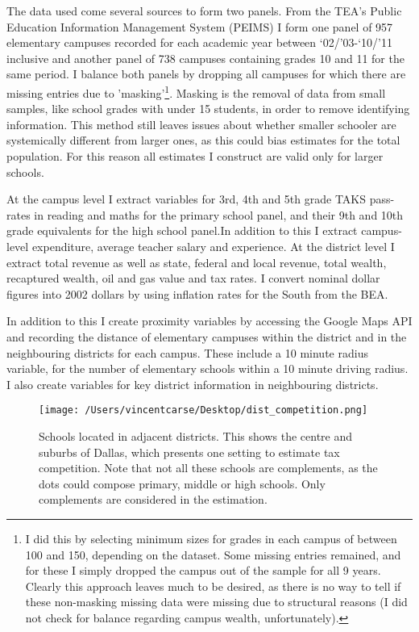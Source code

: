 \documentclass[11pt]{article}
\begin{document}
The data used come several sources to form two panels. From the TEA’s Public Education Information Management System (PEIMS) I form one panel of 957 elementary campuses recorded for each academic year between ‘02/’03-‘10/’11 inclusive and another panel of 738 campuses containing grades 10 and 11 for the same period.  I balance both panels by dropping all campuses for which there are missing entries due to 'masking'\footnote{I did this by selecting minimum sizes for grades in each campus of between 100 and 150, depending on the dataset. Some missing entries remained, and for these I simply dropped the campus out of the sample for all 9 years. Clearly this approach leaves much to be desired, as there is no way to tell if these non-masking missing data were missing due to structural reasons (I did not check for balance regarding campus wealth, unfortunately).}. Masking is the removal of data from small samples, like school grades with under 15 students, in order to remove identifying information. This method still leaves issues about whether smaller schooler are systemically different from larger ones, as this could bias estimates for the total population. For this reason all estimates I construct are valid only for larger schools.  

At the campus level I extract variables for 3rd, 4th and 5th grade TAKS pass-rates in reading and maths for the primary school panel, and their 9th and 10th grade equivalents for the high school panel.In addition to this I extract campus-level expenditure, average teacher salary and experience. At the district level I extract total revenue as well as state, federal and local revenue, total wealth, recaptured wealth, oil and gas value and tax rates. I convert nominal dollar figures into 2002 dollars by using inflation rates for the South from the BEA.

In addition to this I create proximity variables by accessing the Google Maps API and recording the distance of elementary campuses within the district and in the neighbouring districts for each campus. These include a 10 minute radius variable, for the number of elementary schools within a 10 minute driving radius. I also create variables for key district information in neighbouring districts.

\begin{figure}
    \label{image-myimage}
    \texttt{[image: /Users/vincentcarse/Desktop/dist\_competition.png]}
    \caption{Schools located in adjacent districts. This shows the centre and suburbs of Dallas, which presents one setting to estimate tax competition. Note that not all these schools are complements, as the dots could compose primary, middle or high schools. Only complements are considered in the estimation.}
\end{figure}
\end{document}
